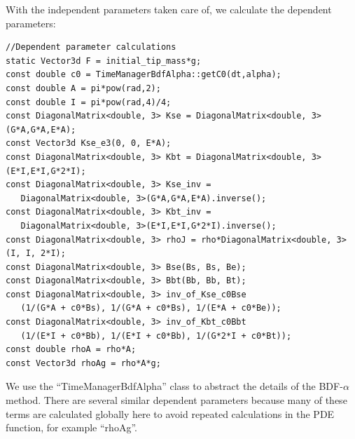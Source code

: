 \documentclass[12pt]{article}
\begin{document}
With the independent parameters taken care of, we calculate the dependent parameters:
\begin{lstlisting}
//Dependent parameter calculations
static Vector3d F = initial_tip_mass*g;
const double c0 = TimeManagerBdfAlpha::getC0(dt,alpha);
const double A = pi*pow(rad,2);
const double I = pi*pow(rad,4)/4;
const DiagonalMatrix<double, 3> Kse = DiagonalMatrix<double, 3>(G*A,G*A,E*A);
const Vector3d Kse_e3(0, 0, E*A);
const DiagonalMatrix<double, 3> Kbt = DiagonalMatrix<double, 3>(E*I,E*I,G*2*I);
const DiagonalMatrix<double, 3> Kse_inv =
   DiagonalMatrix<double, 3>(G*A,G*A,E*A).inverse();
const DiagonalMatrix<double, 3> Kbt_inv =
   DiagonalMatrix<double, 3>(E*I,E*I,G*2*I).inverse();
const DiagonalMatrix<double, 3> rhoJ = rho*DiagonalMatrix<double, 3>(I, I, 2*I);
const DiagonalMatrix<double, 3> Bse(Bs, Bs, Be);
const DiagonalMatrix<double, 3> Bbt(Bb, Bb, Bt);
const DiagonalMatrix<double, 3> inv_of_Kse_c0Bse
   (1/(G*A + c0*Bs), 1/(G*A + c0*Bs), 1/(E*A + c0*Be));
const DiagonalMatrix<double, 3> inv_of_Kbt_c0Bbt
   (1/(E*I + c0*Bb), 1/(E*I + c0*Bb), 1/(G*2*I + c0*Bt));
const double rhoA = rho*A;
const Vector3d rhoAg = rho*A*g;
\end{lstlisting}
We use the ``TimeManagerBdfAlpha'' class to abstract the details of the BDF-$\alpha$ method. There are several similar dependent parameters because many of these terms are calculated globally here to avoid repeated calculations in the PDE function, for example ``rhoAg''.
\end{document}
